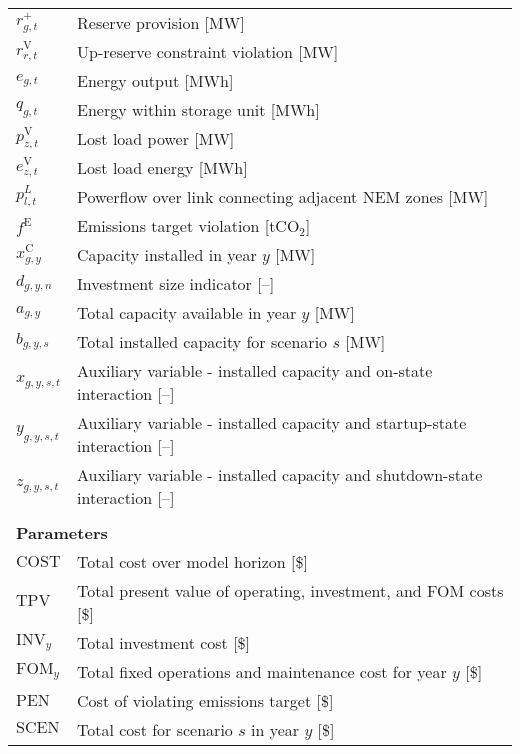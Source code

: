 \documentclass{article}
\newcommand{\sLinks}{L}
\newcommand{\iGenerator}{g}
\newcommand{\iYear}{y}
\newcommand{\iScenario}{s}
\newcommand{\iInterval}{t}
\newcommand{\iZone}{z}
\newcommand{\iRegion}{r}
\newcommand{\iInvestmentSizeOption}{n}
\newcommand{\iLink}{l}
\newcommand{\cFixedOperationsMaintenanceCost}[1][\iYear]{\mathrm{FOM}_{#1}}
\newcommand{\cInvestmentCost}[1][\iYear]{\mathrm{INV}_{#1}}
\newcommand{\cTotalPresentValue}[1][]{\mathrm{TPV}_{#1}}
\newcommand{\cEmissionsViolationTotalCost}{\mathrm{PEN}}
\newcommand{\cObjectiveFunction}{\mathrm{COST}}
\newcommand{\cOperatingCostScenario}[1][]{\mathrm{SCEN}_{#1}}
\newcommand{\vEnergy}[1][\iGenerator,\iInterval]{e_{#1}}
\newcommand{\vInstalledCapacity}[1][\iGenerator,\iYear]{x^{\mathrm{C}}_{#1}}
\newcommand{\vInvestmentSizeIndicator}[1][\iGenerator,\iYear,\iInvestmentSizeOption]{d_{#1}}
\newcommand{\vReserveUp}[1][\iGenerator,\iInterval]{r^{+}_{#1}}
\newcommand{\vReserveUpViolation}[1][\iRegion,\iInterval]{r^{\mathrm{V}}_{#1}}
\newcommand{\vStorageUnitEnergy}[1][\iGenerator,\iInterval]{q_{#1}}
\newcommand{\vPowerFlow}[1][\iLink,\iInterval]{p^{\sLinks}_{#1}}
\newcommand{\vLostLoadEnergy}[1][\iZone,\iInterval]{e^{\mathrm{V}}_{#1}}
\newcommand{\vLostLoadPower}[1][\iZone,\iInterval]{p^{\mathrm{V}}_{#1}}
\newcommand{\vEmissionsTargetViolation}{f^{\mathrm{E}}}
\newcommand{\vInstalledCapacityTotal}[1][\iGenerator,\iYear]{a_{#1}}
\newcommand{\vInstalledCapacityTotalScenario}[1][\iGenerator,\iYear,\iScenario]{b_{#1}}
\newcommand{\vInstalledCapacityOnStateAux}[1][\iGenerator,\iYear,\iScenario,\iInterval]{x_{#1}}
\newcommand{\vInstalledCapacityStartupStateAux}[1][\iGenerator,\iYear,\iScenario,\iInterval]{y_{#1}}
\newcommand{\vInstalledCapacityShutdownStateAux}[1][\iGenerator,\iYear,\iScenario,\iInterval]{z_{#1}}
\begin{document}
\begin{longtable}{ p{}  p{}}
	$\vReserveUp$ & Reserve provision [MW]\\
	$\vReserveUpViolation$ & Up-reserve constraint violation [MW]\\
	
	$\vEnergy$ & Energy output [MWh]\\
	$\vStorageUnitEnergy$ & Energy within storage unit [MWh]\\

	$\vLostLoadPower$ & Lost load power [MW]\\
	$\vLostLoadEnergy$ & Lost load energy [MWh]\\
	$\vPowerFlow$ & Powerflow over link connecting adjacent NEM zones [MW]\\
	$\vEmissionsTargetViolation$ & Emissions target violation [tCO$_{2}$]\\
	$\vInstalledCapacity$ & Capacity installed in year $\iYear$ [MW]\\
	$\vInvestmentSizeIndicator$ & Investment size indicator [--]\\
	$\vInstalledCapacityTotal$ & Total capacity available in year $\iYear$ [MW]\\
	$\vInstalledCapacityTotalScenario$ & Total installed capacity for scenario $\iScenario$ [MW]\\
	$\vInstalledCapacityOnStateAux$ & Auxiliary variable - installed capacity and on-state interaction [--]\\
	$\vInstalledCapacityStartupStateAux$ & Auxiliary variable - installed capacity and startup-state interaction [--]\\
	$\vInstalledCapacityShutdownStateAux$ & Auxiliary variable - installed capacity and shutdown-state interaction [--]\\
	& \\
	\multicolumn{2}{l}{\textbf{Parameters}}\\
	$\cObjectiveFunction$ & Total cost over model horizon [\$]\\
	$\cTotalPresentValue$ & Total present value of operating, investment, and FOM costs [\$]\\
	$\cInvestmentCost$ & Total investment cost [\$]\\
	$\cFixedOperationsMaintenanceCost$ & Total fixed operations and maintenance cost for year $\iYear$ [\$]\\
	$\cEmissionsViolationTotalCost$ & Cost of violating emissions target [\$]\\
	$\cOperatingCostScenario$ & Total cost for scenario $\iScenario$ in year $\iYear$ [\$]\\

\end{longtable}
\end{document}
